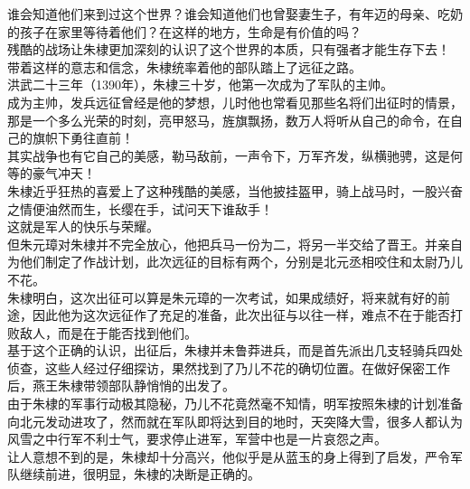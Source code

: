 \begin{multicols}{\theparacolNo}
谁会知道他们来到过这个世界？谁会知道他们也曾娶妻生子，有年迈的母亲、吃奶的孩子在家里等待着他们？在这样的地方，生命是有价值的吗？\\

残酷的战场让朱棣更加深刻的认识了这个世界的本质，只有强者才能生存下去！\\

带着这样的意志和信念，朱棣统率着他的部队踏上了远征之路。\\

洪武二十三年（1390年），朱棣三十岁，他第一次成为了军队的主帅。\\

成为主帅，发兵远征曾经是他的梦想，儿时他也常看见那些名将们出征时的情景，那是一个多么光荣的时刻，亮甲怒马，旌旗飘扬，数万人将听从自己的命令，在自己的旗帜下勇往直前！\\

其实战争也有它自己的美感，勒马敌前，一声令下，万军齐发，纵横驰骋，这是何等的豪气冲天！\\

朱棣近乎狂热的喜爱上了这种残酷的美感，当他披挂盔甲，骑上战马时，一股兴奋之情便油然而生，长缨在手，试问天下谁敌手！\\

这就是军人的快乐与荣耀。\\

但朱元璋对朱棣并不完全放心，他把兵马一份为二，将另一半交给了晋王。并亲自为他们制定了作战计划，此次远征的目标有两个，分别是北元丞相咬住和太尉乃儿不花。\\

朱棣明白，这次出征可以算是朱元璋的一次考试，如果成绩好，将来就有好的前途，因此他为这次远征作了充足的准备，此次出征与以往一样，难点不在于能否打败敌人，而是在于能否找到他们。\\

基于这个正确的认识，出征后，朱棣并未鲁莽进兵，而是首先派出几支轻骑兵四处侦查，这些人经过仔细探访，果然找到了乃儿不花的确切位置。在做好保密工作后，燕王朱棣带领部队静悄悄的出发了。\\

由于朱棣的军事行动极其隐秘，乃儿不花竟然毫不知情，明军按照朱棣的计划准备向北元发动进攻了，然而就在军队即将达到目的地时，天突降大雪，很多人都认为风雪之中行军不利士气，要求停止进军，军营中也是一片哀怨之声。\\

让人意想不到的是，朱棣却十分高兴，他似乎是从蓝玉的身上得到了启发，严令军队继续前进，很明显，朱棣的决断是正确的。\\


\end{multicols}
